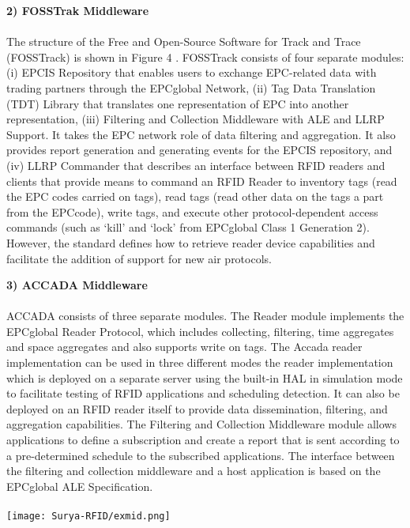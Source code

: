 \documentclass[a4paper,12pt]{article}
\begin{document}
\begin{multicols}{2}
\item \textbf{2) FOSSTrak Middleware	}\\
\\
The structure of the Free and Open-Source Software for
Track and Trace (FOSSTrack) is shown in Figure 4 .
FOSSTrack consists of four separate modules: (i) EPCIS
Repository that enables users to exchange EPC-related data
with trading partners through the EPCglobal Network, (ii)
Tag Data Translation (TDT) Library that translates one
representation of EPC into another representation, (iii)
Filtering and Collection Middleware with ALE and LLRP
Support. It takes the EPC network role of data filtering and
aggregation. It also provides report generation and generating
events for the EPCIS repository, and (iv) LLRP Commander
that describes an interface between RFID readers and clients
that provide means to command an RFID Reader to inventory
tags (read the EPC codes carried on tags), read tags (read
other data on the tags a part from the EPCcode), write tags,
and execute other protocol-dependent access commands
(such as ‘kill’ and ‘lock’ from EPCglobal Class 1 Generation
2). However, the standard defines how to retrieve reader device capabilities and facilitate the addition of support for
new air protocols.
\\

\item\textbf{3) ACCADA Middleware}\\
\\
ACCADA  consists of three separate modules. The
Reader module implements the EPCglobal Reader Protocol,
which includes collecting, filtering, time aggregates and
space aggregates and also supports write on tags. The Accada
reader implementation can be used in three different modes
the reader implementation which is deployed on a separate
server using the built-in HAL in simulation mode to facilitate
testing of RFID applications and scheduling detection. It can
also be deployed on an RFID reader itself to provide data
dissemination, filtering, and aggregation capabilities.
The Filtering and Collection Middleware module allows
applications to define a subscription and create a report that is
sent according to a pre-determined schedule to the subscribed
applications. The interface between the filtering and
collection middleware and a host application is based on the
EPCglobal ALE Specification.
\\
\\
\texttt{[image: Surya-RFID/exmid.png]}


\end{multicols}
\end{document}
